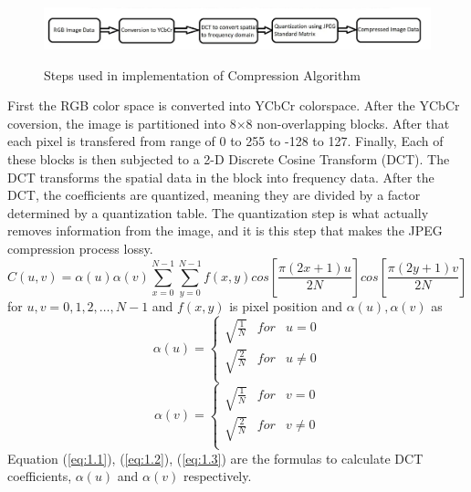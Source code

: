 \begin{figure}[H]
    \includegraphics[width=1\textwidth]{./img/compression.png}\\
    \caption{ Steps used in implementation of Compression Algorithm}
\end{figure}
\begin{flushleft} 
\end{flushleft} 
First the RGB color space is converted into YCbCr colorspace. After the YCbCr coversion, the image is partitioned into 8$\times$8 non-overlapping blocks. After that each pixel is transfered from range of 0 to 255 to -128 to 127. Finally, Each of these blocks is then subjected to a 2-D Discrete Cosine Transform (DCT). The DCT transforms the spatial data in the block into frequency data. After the DCT, the coefficients are quantized, meaning they are divided by a factor determined by a quantization table. The quantization step is what actually removes information from the image, and it is this step that makes the JPEG compression process lossy.
\begin{equation} \label{eq:1.1} 
    C(u,v)=\alpha(u)\alpha(v)\sum_{x=0}^{N-1} \sum_{y=0}^{N-1} f(x,y) cos[\frac{\pi(2x+1)u}{2N}] cos[\frac{\pi(2y+1)v}{2N}]
\end{equation}
\hspace{1cm} for $u,v = 0,1,2,…,N-1$ and $f(x,y)$ is pixel position and $\alpha(u),\alpha(v)$ as 
\begin{equation}\label{eq:1.2}  
    \alpha(u)=\left\{\begin{matrix}
        \sqrt{\frac{1}{N}}& for & u=0 \\
        \sqrt{\frac{2}{N}}& for & u\neq 0 \\
       \end{matrix}\right.
\end{equation}
\begin{equation}\label{eq:1.3}   
    \alpha(v)=\left\{\begin{matrix}
        \sqrt{\frac{1}{N}}& for & v=0 \\
        \sqrt{\frac{2}{N}}& for & v\neq 0 \\
       \end{matrix}\right.
\end{equation}
Equation (\ref{eq:1.1}), (\ref{eq:1.2}), (\ref{eq:1.3}) are the formulas to calculate DCT coefficients, $\alpha(u)$ and $\alpha(v)$ respectively.\cite{4}\\ \\
